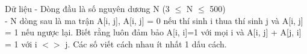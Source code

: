 Dữ liệu
- Dòng đầu là số nguyên dương N (3  $\le$  N  $\le$  500)   
\\   - N dòng sau là ma trận A[i, j], A[i, j] = 0 nếu thí sinh i thua thí sinh j và A[i, j] = 1 nếu ngược lại. Biết rằng luôn đảm bảo A[i, i]=1 với mọi i và A[i, j] + A[j, i] = 1 với i $<$$>$ j. Các số viết cách nhau ít nhất 1 dấu cách.